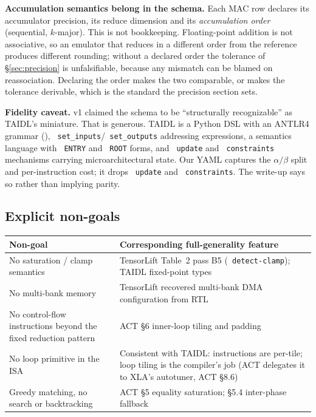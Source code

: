 \documentclass[11pt,a4paper]{article}
\newcommand{\code}[1]{\texttt{\small\hyphenchar\font=45 #1}}
\begin{document}
\noindent\textbf{Accumulation semantics belong in the schema.} Each MAC row declares its accumulator
precision, its reduce dimension and its \emph{accumulation order} (sequential, $k$-major). This is not
bookkeeping. Floating-point addition is not associative, so an emulator that reduces in a different order
from the reference produces different rounding; without a declared order the tolerance of
\S\ref{sec:precision} is unfalsifiable, because any mismatch can be blamed on reassociation. Declaring the
order makes the two comparable, or makes the tolerance derivable, which is the standard the precision section
sets.

\noindent\textbf{Fidelity caveat.} v1 claimed the schema to be ``structurally recognizable'' as TAIDL's
miniature. That is generous. TAIDL is a Python DSL with an ANTLR4 grammar (),
\code{set\_inputs}/\code{set\_outputs} addressing expressions, a semantics language with \code{ENTRY} and
\code{ROOT} forms, and \code{update} and \code{constraints} mechanisms carrying microarchitectural state.
Our YAML captures the $\alpha/\beta$ split and per-instruction cost; it drops \code{update} and
\code{constraints}. The write-up says so rather than implying parity.

\subsection{Explicit non-goals}

\begin{center}
\begin{tabularx}{\textwidth}{@{}>{\raggedright\arraybackslash}X >{\raggedright\arraybackslash}p{5.2cm}@{}}
\toprule
\textbf{Non-goal} & \textbf{Corresponding full-generality feature} \\
\midrule
No saturation / clamp semantics & TensorLift Table~2 pass B5 (\code{detect-clamp}); TAIDL fixed-point types \\
No multi-bank memory & TensorLift recovered multi-bank DMA configuration from RTL \\
No control-flow instructions beyond the fixed reduction pattern & ACT \S6 inner-loop tiling and padding \\
No loop primitive in the ISA & Consistent with TAIDL: instructions are per-tile; loop tiling is the compiler's job (ACT delegates it to XLA's autotuner, ACT \S8.6) \\
Greedy matching, no search or backtracking & ACT \S5 equality saturation; \S5.4 inter-phase fallback \\
\bottomrule
\end{tabularx}
\end{center}
\end{document}
